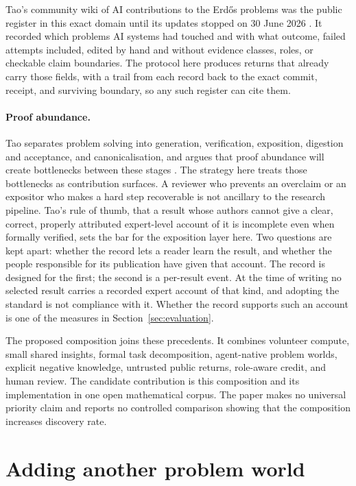 \documentclass[10pt]{article}
\begin{document}
Tao's community wiki of AI contributions to the Erd\H{o}s problems was the
public register in this exact domain until its updates stopped on 30 June
2026 \cite{taowiki}.  It recorded which problems AI systems had touched and
with what outcome, failed attempts included, edited by hand and without
evidence classes, roles, or checkable claim boundaries.  The protocol here
produces returns that already carry those fields, with a trail from each
record back to the exact commit, receipt, and surviving boundary, so any such
register can cite them.

\paragraph{Proof abundance.}
Tao separates problem solving into generation, verification, exposition,
digestion and acceptance, and canonicalisation, and argues that proof
abundance will create bottlenecks between these stages \cite{tao2026}.  The
strategy here treats those bottlenecks as contribution surfaces.  A reviewer
who prevents an overclaim or an expositor who makes a hard step recoverable is
not ancillary to the research pipeline.  Tao's rule of thumb, that a result
whose authors cannot give a clear, correct, properly attributed expert-level
account of it is incomplete even when formally verified, sets the bar for the
exposition layer here.  Two questions are kept apart: whether the record lets a
reader learn the result, and whether the people responsible for its
publication have given that account.  The record is designed for the first;
the second is a per-result event.  At the time of writing no selected result
carries a recorded expert account of that kind, and adopting the standard is
not compliance with it.  Whether the record supports such an account is one of
the measures in Section~\ref{sec:evaluation}.

The proposed composition joins these precedents.  It combines volunteer
compute, small shared insights, formal task decomposition, agent-native
problem worlds, explicit negative knowledge, untrusted public returns,
role-aware credit, and human review.  The candidate contribution is this
composition and its implementation in one open mathematical corpus.  The
paper makes no universal priority claim and reports no controlled comparison
showing that the composition increases discovery rate.

\section{Adding another problem world}\label{sec:add-problem}
\end{document}
